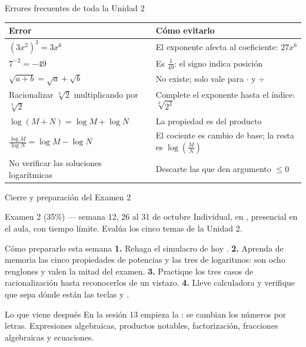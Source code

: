\documentclass[aspectratio=169,10pt]{beamer}
\begin{document}
\begin{frame}{Errores frecuentes de toda la Unidad 2}
  \scriptsize
  \begin{center}
  \begin{tabular}{@{}p{5.2cm}p{6.8cm}@{}}
    \toprule
    \textbf{Error} & \textbf{Cómo evitarlo} \\
    \midrule
    $(3x^{2})^{3}=3x^{6}$ &
      El exponente afecta al coeficiente: $27x^{6}$ \\
    \addlinespace
    $7^{-2}=-49$ &
      Es $\tfrac{1}{49}$: el signo indica posición \\
    \addlinespace
    $\sqrt{a+b}=\sqrt a+\sqrt b$ &
      No existe; solo vale para $\cdot$ y $\div$ \\
    \addlinespace
    Racionalizar $\sqrt[3]{2}$ multiplicando por $\sqrt[3]{2}$ &
      Complete el exponente hasta el índice: $\sqrt[3]{2^{2}}$ \\
    \addlinespace
    $\log(M+N)=\log M+\log N$ &
      La propiedad es del producto \\
    \addlinespace
    $\tfrac{\log M}{\log N}=\log M-\log N$ &
      El cociente es cambio de base; la resta es
      $\log\!\left(\tfrac{M}{N}\right)$ \\
    \addlinespace
    No verificar las soluciones logarítmicas &
      Descarte las que den argumento $\le 0$ \\
    \bottomrule
  \end{tabular}
  \end{center}
\end{frame}

\begin{frame}{Cierre y preparación del Examen 2}
  \scriptsize
  \begin{alertblock}{Examen 2 (35\%) — semana 12, 26 al 31 de octubre}
    \tiny
    Individual, en , presencial en el aula, con
    tiempo límite. Evalúa los cinco temas de la Unidad 2.
  \end{alertblock}

  \vspace{0.1cm}
  \begin{block}{Cómo prepararlo esta semana}
    \tiny
    \textbf{1.} Rehaga el simulacro de hoy . \quad
    \textbf{2.} Aprenda de memoria las cinco propiedades de potencias y las
    tres de logaritmos: son ocho renglones y valen la mitad del examen. \quad
    \textbf{3.} Practique los tres casos de racionalización hasta
    reconocerlos de un vistazo. \quad
    \textbf{4.} Lleve calculadora y verifique que sepa dónde están las teclas
     y .
  \end{block}

  \vspace{0.1cm}
  \begin{exampleblock}{Lo que viene después}
    \tiny
    En la sesión 13 empieza la : se cambian los números por
    letras. Expresiones algebraicas, productos notables, factorización,
    fracciones algebraicas y ecuaciones. 
  \end{exampleblock}
\end{frame}
\end{document}
